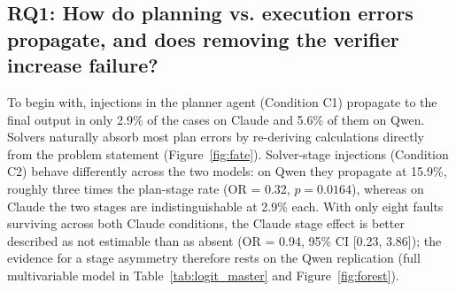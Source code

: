 \documentclass[11pt]{article}
\begin{document}
\subsection*{RQ1: How do planning vs. execution errors propagate, and does removing the verifier increase failure?}

To begin with, injections in the planner agent (Condition C1) propagate to the final output in only 2.9\% of the cases on Claude and 5.6\% of them on Qwen. Solvers naturally absorb most plan errors by re-deriving calculations directly from the problem statement (Figure~\ref{fig:fate}). Solver-stage injections (Condition C2) behave differently across the two models: on Qwen they propagate at 15.9\%, roughly three times the plan-stage rate (OR = 0.32, $p = 0.0164$), whereas on Claude the two stages are indistinguishable at 2.9\% each. With only eight faults surviving across both Claude conditions, the Claude stage effect is better described as not estimable than as absent (OR = 0.94, 95\% CI [0.23, 3.86]); the evidence for a stage asymmetry therefore rests on the Qwen replication (full multivariable model in Table~\ref{tab:logit_master} and Figure~\ref{fig:forest}).
\end{document}
